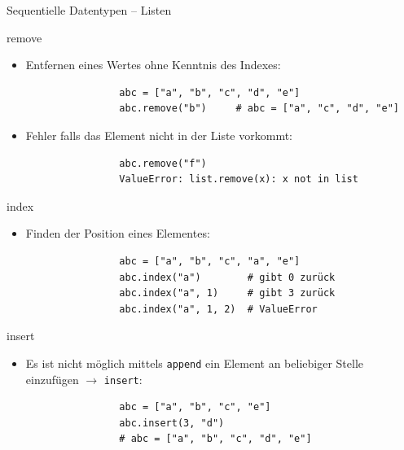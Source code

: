\documentclass[utf8, smaller, c]{beamer}
\begin{document}
\begin{frame}{Sequentielle Datentypen -- Listen}
	\begin{block}{remove}
		\begin{itemize}
			\item Entfernen eines Wertes ohne Kenntnis des Indexes:
			\begin{verbatim}
				abc = ["a", "b", "c", "d", "e"]
				abc.remove("b")		# abc = ["a", "c", "d", "e"]
			\end{verbatim}
			\item Fehler falls das Element nicht in der Liste vorkommt:
			\begin{verbatim}
				abc.remove("f")
				ValueError: list.remove(x): x not in list
			\end{verbatim}
		\end{itemize}
	\end{block}
	\vspace{-2mm}
	\begin{block}{index}
		\begin{itemize}
			\item Finden der Position eines Elementes:
			\begin{verbatim}
				abc = ["a", "b", "c", "a", "e"]
				abc.index("a")        # gibt 0 zurück
				abc.index("a", 1)     # gibt 3 zurück
				abc.index("a", 1, 2)  # ValueError
			\end{verbatim}
		\end{itemize}
	\end{block}

	\framebreak

	\begin{block}{insert}
		\begin{itemize}
			\item Es ist nicht möglich mittels \verb+append+ ein Element an beliebiger Stelle einzufügen $\rightarrow$ 
			\verb+insert+:
			\begin{verbatim}
				abc = ["a", "b", "c", "e"]
				abc.insert(3, "d")
				# abc = ["a", "b", "c", "d", "e"]
			\end{verbatim}
		\end{itemize}
	\end{block}
\end{frame}

\end{document}

